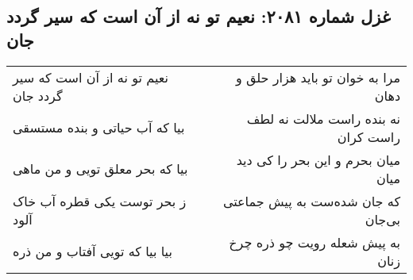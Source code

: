 \begin{center}
\section*{غزل شماره ۲۰۸۱: نعیم تو نه از آن است که سیر گردد جان}
\label{sec:2081}
\begin{longtable}{l p{0.5cm} r}
نعیم تو نه از آن است که سیر گردد جان
&&
مرا به خوان تو باید هزار حلق و دهان
\\
بیا که آب حیاتی و بنده مستسقی
&&
نه بنده راست ملالت نه لطف راست کران
\\
بیا که بحر معلق تویی و من ماهی
&&
میان بحرم و این بحر را کی دید میان
\\
ز بحر توست یکی قطره آب خاک آلود
&&
که جان شده‌ست به پیش جماعتی بی‌جان
\\
بیا بیا که تویی آفتاب و من ذره
&&
به پیش شعله رویت چو ذره چرخ زنان
\\
\end{longtable}
\end{center}

